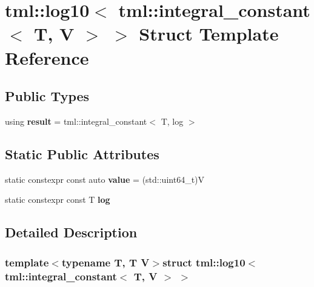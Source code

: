 \hypertarget{structtml_1_1log10_3_01tml_1_1integral__constant_3_01_t_00_01_v_01_4_01_4}{\section{tml\+:\+:log10$<$ tml\+:\+:integral\+\_\+constant$<$ T, V $>$ $>$ Struct Template Reference}
\label{structtml_1_1log10_3_01tml_1_1integral__constant_3_01_t_00_01_v_01_4_01_4}
}
\subsection*{Public Types}
\begin{DoxyCompactItemize}
\item 
\hypertarget{structtml_1_1log10_3_01tml_1_1integral__constant_3_01_t_00_01_v_01_4_01_4_a023009684d421e86ed7d7f3bc6361480}{using {\bfseries result} = tml\+::integral\+\_\+constant$<$ T, log $>$}\label{structtml_1_1log10_3_01tml_1_1integral__constant_3_01_t_00_01_v_01_4_01_4_a023009684d421e86ed7d7f3bc6361480}

\end{DoxyCompactItemize}
\subsection*{Static Public Attributes}
\begin{DoxyCompactItemize}
\item 
\hypertarget{structtml_1_1log10_3_01tml_1_1integral__constant_3_01_t_00_01_v_01_4_01_4_acf33cd8e69d9b48d65e2b1d0fd8eac5b}{static constexpr const auto {\bfseries value} = (std\+::uint64\+\_\+t)V}\label{structtml_1_1log10_3_01tml_1_1integral__constant_3_01_t_00_01_v_01_4_01_4_acf33cd8e69d9b48d65e2b1d0fd8eac5b}

\item 
static constexpr const T {\bfseries log}
\end{DoxyCompactItemize}


\subsection{Detailed Description}
\subsubsection*{template$<$typename T, T V$>$struct tml\+::log10$<$ tml\+::integral\+\_\+constant$<$ T, V $>$ $>$}



